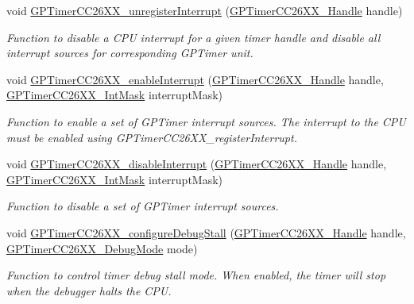 \begin{DoxyCompactItemize}
void \hyperlink{_g_p_timer_c_c26_x_x_8h_adf0a8716a4197bba10d67322c3dfe5ac}{G\+P\+Timer\+C\+C26\+X\+X\+\_\+unregister\+Interrupt} (\hyperlink{_g_p_timer_c_c26_x_x_8h_ab85403dde5940c587c57ca1a140e655a}{G\+P\+Timer\+C\+C26\+X\+X\+\_\+\+Handle} handle)
\begin{DoxyCompactList}\small\item\em Function to disable a C\+P\+U interrupt for a given timer handle and disable all interrupt sources for corresponding G\+P\+Timer unit. \end{DoxyCompactList}\item 
void \hyperlink{_g_p_timer_c_c26_x_x_8h_af08557caa1e95c615a17428521d22d9d}{G\+P\+Timer\+C\+C26\+X\+X\+\_\+enable\+Interrupt} (\hyperlink{_g_p_timer_c_c26_x_x_8h_ab85403dde5940c587c57ca1a140e655a}{G\+P\+Timer\+C\+C26\+X\+X\+\_\+\+Handle} handle, \hyperlink{_g_p_timer_c_c26_x_x_8h_ac74410bfd92bf89732dd795bbe8769d1}{G\+P\+Timer\+C\+C26\+X\+X\+\_\+\+Int\+Mask} interrupt\+Mask)
\begin{DoxyCompactList}\small\item\em Function to enable a set of G\+P\+Timer interrupt sources. The interrupt to the C\+P\+U must be enabled using G\+P\+Timer\+C\+C26\+X\+X\+\_\+register\+Interrupt. \end{DoxyCompactList}\item 
void \hyperlink{_g_p_timer_c_c26_x_x_8h_a8aca62c518c9ff0347ec09f464b88b26}{G\+P\+Timer\+C\+C26\+X\+X\+\_\+disable\+Interrupt} (\hyperlink{_g_p_timer_c_c26_x_x_8h_ab85403dde5940c587c57ca1a140e655a}{G\+P\+Timer\+C\+C26\+X\+X\+\_\+\+Handle} handle, \hyperlink{_g_p_timer_c_c26_x_x_8h_ac74410bfd92bf89732dd795bbe8769d1}{G\+P\+Timer\+C\+C26\+X\+X\+\_\+\+Int\+Mask} interrupt\+Mask)
\begin{DoxyCompactList}\small\item\em Function to disable a set of G\+P\+Timer interrupt sources. \end{DoxyCompactList}\item 
void \hyperlink{_g_p_timer_c_c26_x_x_8h_a5a8bdc7643305d21dcfcd567d215b7f8}{G\+P\+Timer\+C\+C26\+X\+X\+\_\+configure\+Debug\+Stall} (\hyperlink{_g_p_timer_c_c26_x_x_8h_ab85403dde5940c587c57ca1a140e655a}{G\+P\+Timer\+C\+C26\+X\+X\+\_\+\+Handle} handle, \hyperlink{_g_p_timer_c_c26_x_x_8h_ab4c80c79c9acaf8e482e8244adbae73e}{G\+P\+Timer\+C\+C26\+X\+X\+\_\+\+Debug\+Mode} mode)
\begin{DoxyCompactList}\small\item\em Function to control timer debug stall mode. When enabled, the timer will stop when the debugger halts the C\+P\+U. \end{DoxyCompactList}\end{DoxyCompactItemize}


